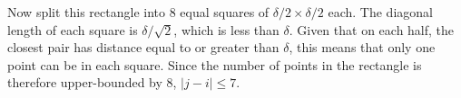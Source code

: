 \documentclass[11pt]{article}
\begin{document}
	Now split this rectangle into 8 equal squares of $\delta/2 \times \delta/2$ each. The diagonal length of each square is $\delta/\sqrt{2}$, which is less than $\delta$. Given that on each half, the closest pair has distance equal to or greater than $\delta$, this means that only one point can be in each square. Since the number of points in the rectangle is therefore upper-bounded by 8, $|j - i| \leq 7$.

%		
%		


\end{document}
